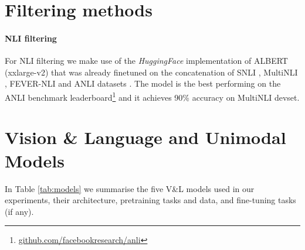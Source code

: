 \documentclass[11pt]{article}
\newcommand{\dataset}{VALSE}
\begin{document}
\begin{table*}[!t]
{    }
    \caption{Manual validation results for each piece in \dataset{}, as well as for the Foil-it dataset. {\em \#Inst.}: number of instances for linguistic phenomenon. {\em \#Valid (\%)}: number (percent) of cases for which at least 2 out of 3 annotators chose the caption; {\em \#Unan. (\%)}: number (percent) of cases for which all annotators chose the caption; {\em \#Lex.It.}:
    number of phrases or lexical items in the vocabulary that differ between foils and captions; {\em JS}: Jensen-Shannon divergence between foil-caption distributions for all instances in the whole instrument; {\em JS Val.}: Jensen-Shannon divergence between foil-caption distribution for the valid subset of the instrument, after sub-sampling; {\em $\alpha$}: Krippendorff's $\alpha$ coefficient computed over all the instances; {\em $\alpha$ valid}: Krippendorff's $\alpha$ coefficient computed over the {\em Valid} instances.}
    \label{tab:mturk-results}
\end{table*} 


\section{Filtering methods}\label{app:filtering}

\paragraph{NLI filtering} For NLI filtering we make use of the \textit{HuggingFace} \cite{wolf2020transformers} implementation of ALBERT (xxlarge-v2) that was already finetuned on the concatenation of SNLI \cite{bowman2015large}, MultiNLI \cite{williams2017broad}, FEVER-NLI \cite{nie2019combining} and ANLI datasets \cite{nie2019adversarial}. The model is the best performing on the ANLI benchmark leaderboard\footnote{\url{github.com/facebookresearch/anli}} and it achieves 90\% accuracy on MultiNLI devset.


\section{Vision \& Language and Unimodal Models}\label{app:models}

In Table \ref{tab:models} we summarise the five V\&L models used in our experiments, their architecture, pretraining tasks and data, and fine-tuning tasks (if any).
\end{document}
